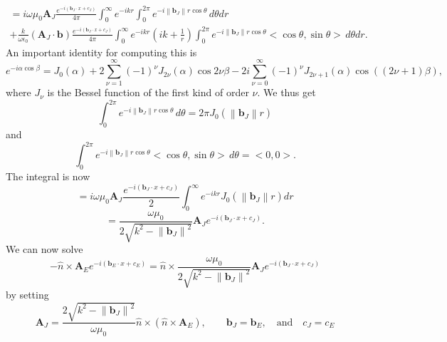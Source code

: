 \documentclass{article}
\newcommand{\norm}[1]{\left\lVert #1 \right\rVert}
\theoremstyle{plain}
\begin{document}
\begin{multline}
	=i\omega\mu_0 \mathbf{A}_J\frac{e^{-i(\mathbf{b}_J\cdot x + c_J)}}{4\pi}
	\int_0^\infty e^{-ikr} \int_0^{2\pi} e^{-i\norm{\mathbf{b}_J}r\cos{\theta}} \,d\theta dr \\
	+ \frac{k}{\omega\epsilon_0}(\mathbf{A}_J\cdot\mathbf{b})\frac{e^{-i(\mathbf{b}_J\cdot x + c_J)}}{4\pi}
	\int_0^\infty e^{-ikr}\left( ik + \frac{1}{r} \right) \int_0^{2\pi} e^{-i\norm{\mathbf{b}_J}r\cos{\theta}} <\cos{\theta},\sin{\theta}> \,d\theta dr.
\end{multline}
An important identity for computing this is
\begin{equation}
	e^{-i\alpha\cos{\beta}}
	= J_0(\alpha) + 2\sum_{\nu=1}^\infty (-1)^\nu J_{2\nu}(\alpha)\cos{2\nu\beta} 
	- 2i\sum_{\nu=0}^\infty (-1)^\nu J_{2\nu+1}(\alpha)\cos{\left((2\nu+1)\beta\right)},
\end{equation}
where $J_\nu$ is the Bessel function of the first kind of order $\nu$.
We thus get
\begin{equation}
	\int_0^{2\pi} e^{-i\norm{\mathbf{b}_J}r\cos{\theta}} \,d\theta = 2\pi J_0(\norm{\mathbf{b}_J}r)
\end{equation}
and
\begin{equation}
	\int_0^{2\pi} e^{-i\norm{\mathbf{b}_J}r\cos{\theta}} <\cos{\theta},\sin{\theta}> \,d\theta = <0,0>.
\end{equation}
The integral is now
\begin{equation}
	=i\omega\mu_0 \mathbf{A}_J\frac{e^{-i(\mathbf{b}_J\cdot x + c_J)}}{2}
	\int_0^\infty e^{-ikr} J_0(\norm{\mathbf{b}_J}r) dr
\end{equation}
\begin{equation}
	= \frac{\omega\mu_0}{2\sqrt{k^2 - \norm{\mathbf{b}_J}^2}} \mathbf{A}_J e^{-i(\mathbf{b}_J\cdot x + c_J)}.
\end{equation}
We can now solve
\begin{equation}
	-\hat{n}\times\mathbf{A}_E e^{-i(\mathbf{b}_E\cdot x + c_E)}
	= \hat{n}\times\frac{\omega\mu_0}{2\sqrt{k^2 - \norm{\mathbf{b}_J}^2}} \mathbf{A}_J e^{-i(\mathbf{b}_J\cdot x + c_J)}
\end{equation}
by setting
\begin{equation}
	\mathbf{A}_J = \frac{2\sqrt{k^2 - \norm{\mathbf{b}_J}^2}}{\omega\mu_0} \hat{n}\times( \hat{n}\times\mathbf{A}_E ),
	\quad\quad \mathbf{b}_J = \mathbf{b}_E,
	\quad\text{and}\quad c_J = c_E
\end{equation}
\end{document}
